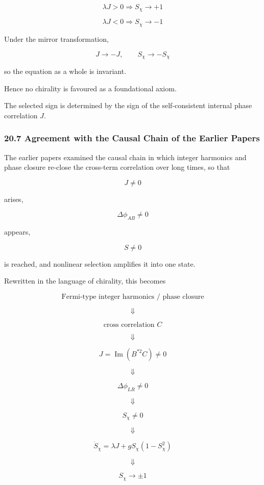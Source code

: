 \documentclass[
  a4paper,
]{article}
\begin{document}
\[
\boxed{
\lambda J>0
\Longrightarrow
S_\chi\to+1
}
\tag{169}
\]

\[
\boxed{
\lambda J<0
\Longrightarrow
S_\chi\to-1
}
\tag{170}
\]

Under the mirror transformation,

\[
J\to-J,
\qquad
S_\chi\to-S_\chi
\]

so the equation as a whole is invariant.

Hence no chirality is favoured as a foundational axiom.

The selected sign is determined by the sign of the self-consistent
internal phase correlation \(J\).

\subsubsection{20.7 Agreement with the Causal Chain of the Earlier
Papers}\label{agreement-with-the-causal-chain-of-the-earlier-papers}

The earlier papers examined the causal chain in which integer harmonics
and phase closure re-close the cross-term correlation over long times,
so that

\[
J\neq0
\]

arises,

\[
\Delta\phi_{AB}\neq0
\]

appears,

\[
S\neq0
\]

is reached, and nonlinear selection amplifies it into one state.

Rewritten in the language of chirality, this becomes

\[
\boxed{
\text{Fermi-type integer harmonics / phase closure}
}
\]

\[
\Downarrow
\]

\[
\boxed{
\text{cross correlation }C
}
\]

\[
\Downarrow
\]

\[
\boxed{
J
=
\operatorname{Im}(B^{*2}C)
\neq0
}
\]

\[
\Downarrow
\]

\[
\boxed{
\Delta\phi_{LR}\neq0
}
\]

\[
\Downarrow
\]

\[
\boxed{
S_\chi\neq0
}
\]

\[
\Downarrow
\]

\[
\boxed{
\dot S_\chi
=
\lambda J
+
gS_\chi(1-S_\chi^2)
}
\]

\[
\Downarrow
\]

\[
\boxed{
S_\chi\to\pm1
}
\tag{171}
\]
\end{document}
